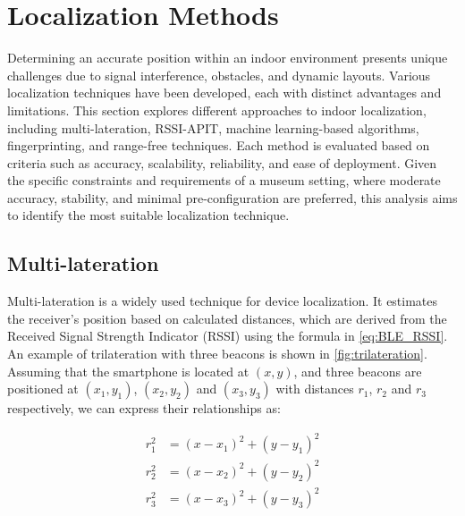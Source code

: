 \section{Localization Methods}
\samepage 
Determining an accurate position within an indoor environment presents unique challenges due to signal interference, obstacles, and dynamic layouts. Various localization techniques have been developed, each with distinct advantages and limitations. This section explores different approaches to indoor localization, including multi-lateration, RSSI-APIT, machine learning-based algorithms, fingerprinting, and range-free techniques. Each method is evaluated based on criteria such as accuracy, scalability, reliability, and ease of deployment. Given the specific constraints and requirements of a museum setting, where moderate accuracy, stability, and minimal pre-configuration are preferred, this analysis aims to identify the most suitable localization technique. 

\subsection{Multi-lateration}

Multi-lateration is a widely used technique for device localization. It estimates the receiver's position based on calculated distances, which are derived from the Received Signal Strength Indicator (RSSI) using the formula in \autoref{eq:BLE_RSSI}.  
An example of trilateration with three beacons is shown in \autoref{fig:trilateration}. Assuming that the smartphone is located at $(x,y)$, and three beacons are positioned at $(x_1,y_1)$, $(x_2,y_2)$ and $(x_3,y_3)$ with distances $r_1$, $r_2$ and $r_3$ respectively, we can express their relationships as:

\begin{equation}
    \begin{split}
        r^{2}_{1} & = (x - x_1)^2 + (y - y_1)^2 \\
        r^{2}_{2} & = (x - x_2)^2 + (y - y_2)^2 \\
        r^{2}_{3} & = (x - x_3)^2 + (y - y_3)^2
    \end{split}
\end{equation}

